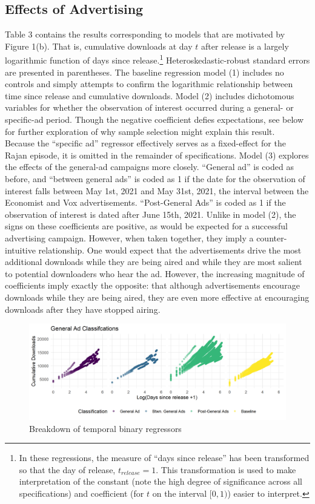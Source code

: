 \documentclass[11pt, letterpaper, twoside]{article}
\begin{document}
\subsection{Effects of Advertising}
Table 3 contains the results corresponding to models that are motivated by Figure 1(b). That is, cumulative downloads at day $t$ after release is a largely logarithmic function of days since release.\footnote{In these regressions, the measure of ``days since release'' has been transformed so that the day of release, $t_{release}=1$. This transformation is used to make interpretation of the constant (note the high degree of significance across all specifications) and coefficient (for $t$ on the interval $[0,1)$) easier to interpret. } Heteroskedastic-robust standard errors are presented in parentheses. The baseline regression model (1) includes no controls and simply attempts to confirm the logarithmic relationship between time since release and cumulative downloads. Model (2) includes dichotomous variables for whether the observation of interest occurred during a general- or specific-ad period. Though the negative coefficient defies expectations, see below for further exploration of why sample selection might explain this result.\\

Because the ``specific ad'' regressor effectively serves as a fixed-effect for the Rajan episode, it is omitted in the remainder of specifications. Model (3) explores the effects of the general-ad campaigns more closely. ``General ad'' is coded as before, and ``between general ads'' is coded as 1 if the date for the observation of interest falls between May 1st, 2021 and May 31st, 2021, the interval between the Economist and Vox advertisements. ``Post-General Ads'' is coded as 1 if the observation of interest is dated after June 15th, 2021. Unlike in model (2), the signs on these coefficients are positive, as would be expected for a successful advertising campaign. However, when taken together, they imply a counter-intuitive relationship. One would expect that the advertisements drive the most additional downloads while they are being aired and while they are most salient to potential downloaders who hear the ad. However, the increasing magnitude of coefficients imply exactly the opposite: that although advertisements encourage downloads while they are being aired, they are even more effective at encouraging downloads after they have stopped airing.\\ 

\begin{figure}[h]
    \centering    
    \includegraphics[width=\textwidth]{general_ad_class_plot.png}
    \caption{Breakdown of temporal binary regressors}
\end{figure}
\end{document}
